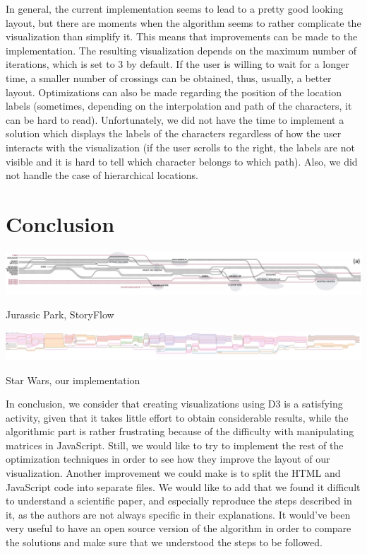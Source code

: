 \documentclass{report}
\begin{document}
In general, the current implementation seems to lead to a pretty good looking layout, but there are moments when the algorithm seems to rather complicate the visualization than simplify it. This means that improvements can be made to the implementation. The resulting visualization depends on the maximum number of iterations, which is set to 3 by default. If the user is willing to wait for a longer time, a smaller number of crossings can be obtained, thus, usually, a better layout.
Optimizations can also be made regarding the position of the location labels (sometimes, depending on the interpolation and path of the characters, it can be hard to read). Unfortunately, we did not have the time to implement a solution which displays the labels of the characters regardless of how the user interacts with the visualization (if the user scrolls to the right, the labels are not visible and it is hard to tell which character belongs to which path).
Also, we did not handle the case of hierarchical locations.

\chapter{Conclusion}
\par
\centerline{\includegraphics[width=\textwidth]{jurassic_park}}
\par
\begin{center}
Jurassic Park, StoryFlow
\end{center}
\centerline{\includegraphics[width=\textwidth]{after_overview}}
\par
\begin{center}
Star Wars, our implementation
\end{center}

In conclusion, we consider that creating visualizations using D3 is a satisfying activity, given that it takes little effort to obtain considerable results, while the algorithmic part is rather frustrating because of the difficulty with manipulating matrices in JavaScript. Still, we would like to try to implement the rest of the optimization techniques in order to see how they improve the layout of our visualization. Another improvement we could make is to split the HTML and JavaScript code into separate files. We would like to add that we found it difficult to understand a scientific paper, and especially reproduce the steps described in it, as the authors are not always specific in their explanations. It would've been very useful to have an open source version of the algorithm in order to compare the solutions and make sure that we understood the steps to be followed.

  

\end{document}
